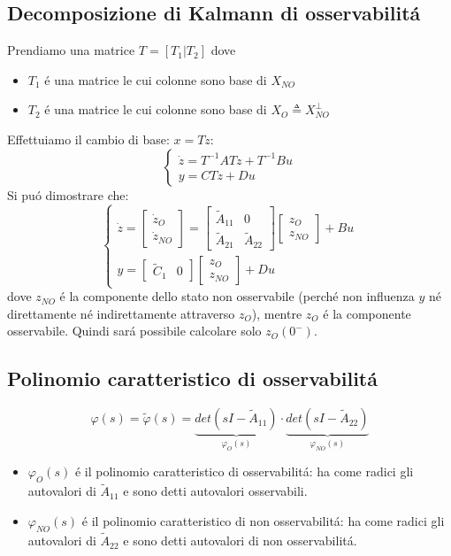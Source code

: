 \documentclass[../main.tex]{subfiles}
\begin{document}
	\subsection{Decomposizione di Kalmann di osservabilit\'a}
		Prendiamo una matrice $ T = [T_1 | T_2] $ dove
		\begin{itemize}
			\item 
				$ T_1 $ \'e una matrice le cui colonne sono base di $ X_{NO} $
			\item
				$ T_2 $ \'e una matrice le cui colonne sono base di $ X_O \triangleq X_{NO}^{\perp} $
		\end{itemize}
		Effettuiamo il cambio di base: $ x = Tz $:
		\[
			\begin{cases}
				\dot z = T^{-1}ATz + T^{-1}Bu\\
				y = CTz + Du
			\end{cases}
		\]
		Si pu\'o dimostrare che:
		\[
			\begin{cases}
				\dot z =
				\begin{bmatrix}
					\dot z_O\\
					\dot z_{NO}
				\end{bmatrix} =
				\begin{bmatrix}
					\tilde A_{11} & 0\\
					\tilde A_{21} & \tilde A_{22}
				\end{bmatrix}
				\begin{bmatrix}
					z_O\\
					z_{NO}
				\end{bmatrix}
				+ Bu
				\\[.5cm]
				y =
				\begin{bmatrix}
					\tilde C_1 & 0
				\end{bmatrix}
				\begin{bmatrix}
					z_{O}\\
					z_{NO}
				\end{bmatrix}
				+ Du
			\end{cases}
		\]
		dove $ z_{NO} $ \'e la componente dello stato non osservabile (perch\'e non influenza $ y $ n\'e direttamente n\'e indirettamente attraverso $ z_O $), mentre $ z_O $ \'e la componente osservabile. Quindi sar\'a possibile calcolare solo $ z_O(0^{-}) $.
		
	\subsection{Polinomio caratteristico di osservabilit\'a}
		\[
			\varphi(s) = \tilde{\varphi}(s) = \underbrace{det(sI- \tilde A_{11})}_{\varphi_O(s)} \cdot \underbrace{det(sI- \tilde A_{22})}_{\varphi_{NO}(s)}
		\]
		\begin{itemize}
			\item 
				$ \varphi_O(s) $ \'e il polinomio caratteristico di osservabilit\'a: ha come radici gli autovalori di $ \tilde A_{11} $ e sono detti autovalori osservabili.
			\item 
				$ \varphi_{NO}(s) $ \'e il polinomio caratteristico di non osservabilit\'a: ha come radici gli autovalori di $ \tilde A_{22} $ e sono detti autovalori di non osservabilit\'a.
		\end{itemize}
	
\end{document}
